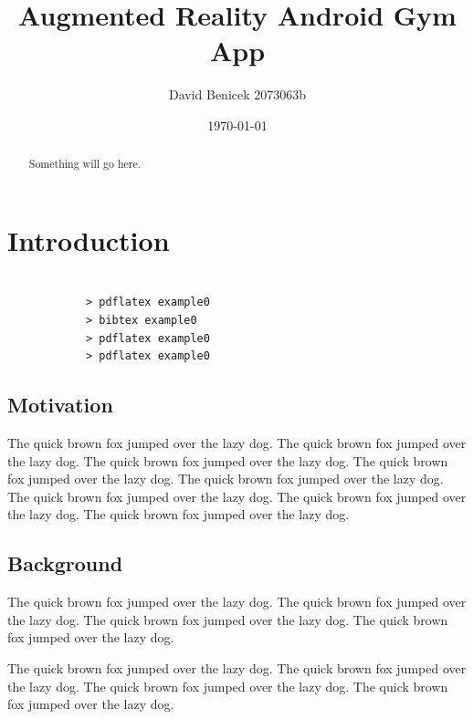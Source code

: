 \documentclass{l4proj}
\begin{document}
\title{Augmented Reality Android Gym App}
\author{David Benicek 2073063b}
\date{\today}
\maketitle

\begin{abstract}
Something will go here.
\end{abstract}

\educationalconsent
%
%
\tableofcontents

\chapter{Introduction}


\begin{verbatim}

            > pdflatex example0
            > bibtex example0
            > pdflatex example0
            > pdflatex example0

\end{verbatim}


\section{Motivation}
The quick brown fox jumped over the lazy dog.
The quick brown fox jumped over the lazy dog.
The quick brown fox jumped over the lazy dog.
The quick brown fox jumped over the lazy dog.
The quick brown fox jumped over the lazy dog.
The quick brown fox jumped over the lazy dog.
The quick brown fox jumped over the lazy dog.
The quick brown fox jumped over the lazy dog.

\section{Background}
The quick brown fox jumped over the lazy dog.
The quick brown fox jumped over the lazy dog.
The quick brown fox jumped over the lazy dog.
The quick brown fox jumped over the lazy dog.

The quick brown fox jumped over the lazy dog.
The quick brown fox jumped over the lazy dog.
The quick brown fox jumped over the lazy dog.
The quick brown fox jumped over the lazy dog.
\end{document}
